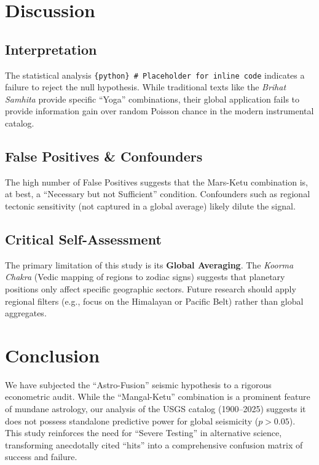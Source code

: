 \documentclass[
  11pt,
  a4paper,
  oneside,
  openany]{article}
\begin{document}
\section{Discussion}\label{discussion}

\subsection{Interpretation}\label{interpretation}

The statistical analysis
\texttt{\{python\}\ \#\ Placeholder\ for\ inline\ code} indicates a
failure to reject the null hypothesis. While traditional texts like the
\emph{Brihat Samhita} provide specific ``Yoga'' combinations, their
global application fails to provide information gain over random Poisson
chance in the modern instrumental catalog.

\subsection{False Positives \&
Confounders}\label{false-positives-confounders}

The high number of False Positives suggests that the Mars-Ketu
combination is, at best, a ``Necessary but not Sufficient'' condition.
Confounders such as regional tectonic sensitivity (not captured in a
global average) likely dilute the signal.

\subsection{Critical Self-Assessment}\label{critical-self-assessment}

The primary limitation of this study is its \textbf{Global Averaging}.
The \emph{Koorma Chakra} (Vedic mapping of regions to zodiac signs)
suggests that planetary positions only affect specific geographic
sectors. Future research should apply regional filters (e.g., focus on
the Himalayan or Pacific Belt) rather than global aggregates.

\section{Conclusion}\label{conclusion}

We have subjected the ``Astro-Fusion'' seismic hypothesis to a rigorous
econometric audit. While the ``Mangal-Ketu'' combination is a prominent
feature of mundane astrology, our analysis of the USGS catalog
(1900--2025) suggests it does not possess standalone predictive power
for global seismicity (\(p > 0.05\)). This study reinforces the need for
``Severe Testing'' in alternative science, transforming anecdotally
cited ``hits'' into a comprehensive confusion matrix of success and
failure.
\end{document}
